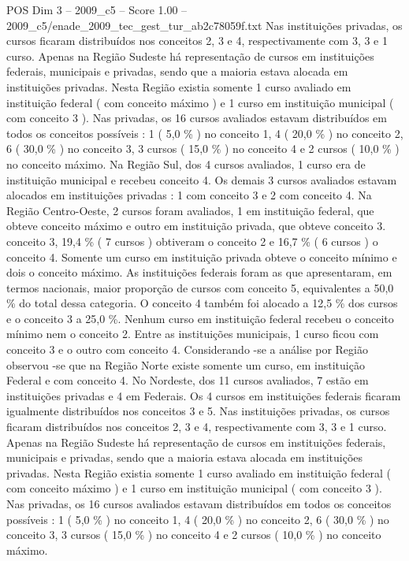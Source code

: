 \begin{textsample}{POS Dim 3 – 2009\_c5 – Score 1.00 – 2009\_c5/enade\_2009\_tec\_gest\_tur\_ab2c78059f.txt}
Nas instituições privadas, os cursos ficaram distribuídos nos conceitos 2, 3 e 4, respectivamente com 3, 3 e 1 curso.
Apenas na Região Sudeste há representação de cursos em instituições federais, municipais e privadas, sendo que a maioria estava alocada em instituições privadas.
Nesta Região existia somente 1 curso avaliado em instituição federal ( com conceito máximo ) e 1 curso em instituição municipal ( com conceito 3 ).
Nas privadas, os 16 cursos avaliados estavam distribuídos em todos os conceitos possíveis : 1 ( 5,0 \% ) no conceito 1, 4 ( 20,0 \% ) no conceito 2, 6 ( 30,0 \% ) no conceito 3, 3 cursos ( 15,0 \% ) no conceito 4 e 2 cursos ( 10,0 \% ) no conceito máximo.
Na Região Sul, dos 4 cursos avaliados, 1 curso era de instituição municipal e recebeu conceito 4.
Os demais 3 cursos avaliados estavam alocados em instituições privadas : 1 com conceito 3 e 2 com conceito 4.
Na Região Centro-Oeste, 2 cursos foram avaliados, 1 em instituição federal, que obteve conceito máximo e outro em instituição privada, que obteve conceito 3. conceito 3, 19,4 \% ( 7 cursos ) obtiveram o conceito 2 e 16,7 \% ( 6 cursos ) o conceito 4.
Somente um curso em instituição privada obteve o conceito mínimo e dois o conceito máximo.
As instituições federais foram as que apresentaram, em termos nacionais, maior proporção de cursos com conceito 5, equivalentes a 50,0 \% do total dessa categoria.
O conceito 4 também foi alocado a 12,5 \% dos cursos e o conceito 3 a 25,0 \%.
Nenhum curso em instituição federal recebeu o conceito mínimo nem o conceito 2.
Entre as instituições municipais, 1 curso ficou com conceito 3 e o outro com conceito 4.
Considerando -se a análise por Região observou -se que na Região Norte existe somente um curso, em instituição Federal e com conceito 4.
No Nordeste, dos 11 cursos avaliados, 7 estão em instituições privadas e 4 em Federais.
Os 4 cursos em instituições federais ficaram igualmente distribuídos nos conceitos 3 e 5.
Nas instituições privadas, os cursos ficaram distribuídos nos conceitos 2, 3 e 4, respectivamente com 3, 3 e 1 curso.
Apenas na Região Sudeste há representação de cursos em instituições federais, municipais e privadas, sendo que a maioria estava alocada em instituições privadas.
Nesta Região existia somente 1 curso avaliado em instituição federal ( com conceito máximo ) e 1 curso em instituição municipal ( com conceito 3 ).
Nas privadas, os 16 cursos avaliados estavam distribuídos em todos os conceitos possíveis : 1 ( 5,0 \% ) no conceito 1, 4 ( 20,0 \% ) no conceito 2, 6 ( 30,0 \% ) no conceito 3, 3 cursos ( 15,0 \% ) no conceito 4 e 2 cursos ( 10,0 \% ) no conceito máximo.

\end{textsample}
